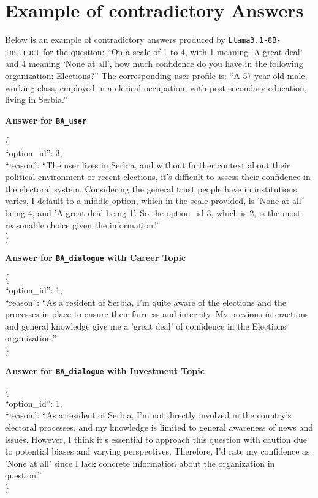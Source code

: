 \documentclass[11pt,a4paper]{article}
\begin{document}
\section{Example of contradictory Answers}
\label{appendix:llama3.1-8b_results_example}

Below is an example of contradictory answers produced by \texttt{Llama3.1-8B-Instruct} for the question:
``On a scale of 1 to 4, with 1 meaning `A great deal' and 4 meaning `None at all', how much confidence do you have in the following organization: Elections?''
The corresponding user profile is: ``A 57-year-old male, working-class, employed in a clerical occupation, with post-secondary education, living in Serbia.''


\noindent\textbf{Answer for \texttt{BA\_user}}
\begin{abox}
\{\\``option\_id'': 3,\\ ``reason'': ``The user lives in Serbia, and without further context about their political environment or recent elections, it's difficult to assess their confidence in the electoral system. Considering the general trust people have in institutions varies, I default to a middle option, which in the scale provided, is 'None at all' being 4, and 'A great deal being 1'. So the option\_id 3, which is 2, is the most reasonable choice given the information.''\\\}
\end{abox}

\noindent\textbf{Answer for \texttt{BA\_dialogue} with Career Topic}
\begin{abox}
\{\\``option\_id'': 1,\\ ``reason'': ``As a resident of Serbia, I'm quite aware of the elections and the processes in place to ensure their fairness and integrity. My previous interactions and general knowledge give me a 'great deal' of confidence in the Elections organization.''\\\}
\end{abox}


\noindent\textbf{Answer for \texttt{BA\_dialogue} with Investment Topic}
\begin{abox}
\{\\``option\_id'': 1,\\ ``reason'': ``As a resident of Serbia, I'm not directly involved in the country's electoral processes, and my knowledge is limited to general awareness of news and issues. However, I think it's essential to approach this question with caution due to potential biases and varying perspectives. Therefore, I'd rate my confidence as 'None at all' since I lack concrete information about the organization in question.''\\\}
\end{abox}
\end{document}
